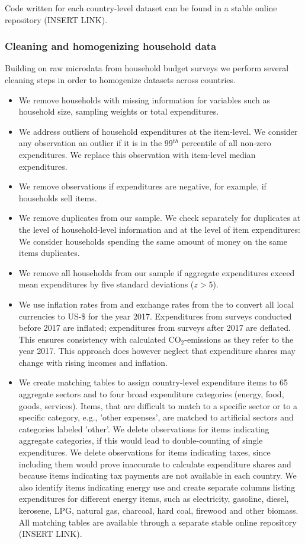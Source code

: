 \documentclass[12pt, a4paper]{article}
\begin{document}
Code written for each country-level dataset can be found in a stable online repository (INSERT LINK).

\subsubsection{Cleaning and homogenizing household data}

Building on raw microdata from household budget surveys we perform several cleaning steps in order to homogenize datasets across countries.

\begin{itemize}
    \item We remove households with missing information for variables such as household size, sampling weights or total expenditures.
    \item We address outliers of household expenditures at the item-level. We consider any observation an outlier if it is in the 99$^{th}$ percentile of all non-zero expenditures. We replace this observation with item-level median expenditures.
    \item We remove observations if expenditures are negative, for example, if households sell items.
    \item We remove duplicates from our sample. We check separately for duplicates at the level of household-level information and at the level of item expenditures: We consider households spending the same amount of money on the same items duplicates.
    \item We remove all households from our sample if aggregate expenditures exceed mean expenditures by five standard deviations ($z>5$).
    \item We use inflation rates from \textcite{IMF.2020} and exchange rates from the \textcite{WorldBankGroup.2023} to convert all local currencies to US-\$ for the year 2017. Expenditures from surveys conducted before 2017 are inflated; expenditures from surveys after 2017 are deflated. This ensures consistency with calculated CO$_{2}$-emissions as they refer to the year 2017. This approach does however neglect that expenditure shares may change with rising incomes and inflation.
    \item We create matching tables to assign country-level expenditure items to 65 aggregate sectors and to four broad expenditure categories (energy, food, goods, services). Items, that are difficult to match to a specific sector or to a specific category, e.g., 'other expenses', are matched to artificial sectors and categories labeled 'other'. We delete observations for items indicating aggregate categories, if this would lead to double-counting of single expenditures. We delete observations for items indicating taxes, since including them would prove inaccurate to calculate expenditure shares and because items indicating tax payments are not available in each country. We also identify items indicating energy use and create separate columns listing expenditures for different energy items, such as electricity, gasoline, diesel, kerosene, LPG, natural gas, charcoal, hard coal, firewood and other biomass. All matching tables are available through a separate stable online repository (INSERT LINK).

\end{itemize}
\end{document}
